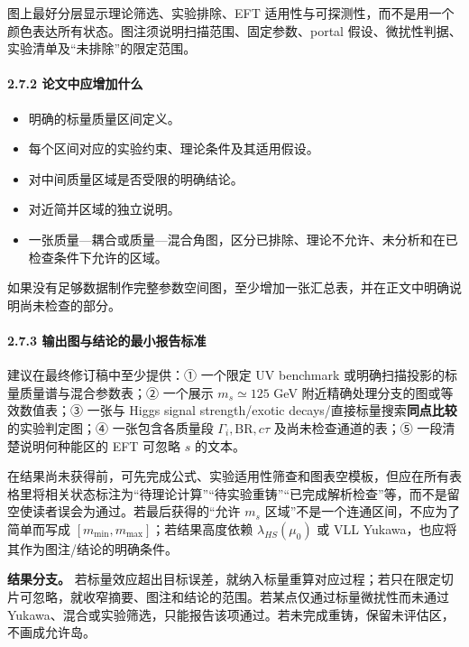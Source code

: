 \documentclass[
]{article}
\providecommand{\tightlist}{%
  \setlength{\itemsep}{0pt}\setlength{\parskip}{0pt}}
\begin{document}
图上最好分层显示理论筛选、实验排除、EFT
适用性与可探测性，而不是用一个颜色表达所有状态。图注须说明扫描范围、固定参数、portal
假设、微扰性判据、实验清单及``未排除''的限定范围。

\paragraph{2.7.2
论文中应增加什么}\label{ux8bbaux6587ux4e2dux5e94ux589eux52a0ux4ec0ux4e48}

\begin{itemize}
\tightlist
\item
  明确的标量质量区间定义。
\item
  每个区间对应的实验约束、理论条件及其适用假设。
\item
  对中间质量区域是否受限的明确结论。
\item
  对近简并区域的独立说明。
\item
  一张质量---耦合或质量---混合角图，区分已排除、理论不允许、未分析和在已检查条件下允许的区域。
\end{itemize}

如果没有足够数据制作完整参数空间图，至少增加一张汇总表，并在正文中明确说明尚未检查的部分。

\paragraph{2.7.3
输出图与结论的最小报告标准}\label{ux8f93ux51faux56feux4e0eux7ed3ux8bbaux7684ux6700ux5c0fux62a5ux544aux6807ux51c6}

建议在最终修订稿中至少提供：① 一个限定 UV benchmark
或明确扫描投影的标量质量谱与混合参数表；② 一个展示 \(m_s\simeq125\) GeV
附近精确处理分支的图或等效数值表；③ 一张与 Higgs signal strength/exotic
decays/直接标量搜索\textbf{同点比较}的实验判定图；④ 一张包含各质量段
\(\Gamma_i,\mathrm{BR},c\tau\) 及尚未检查通道的表；⑤
一段清楚说明何种能区的 EFT 可忽略 \(s\) 的文本。

在结果尚未获得前，可先完成公式、实验适用性筛查和图表空模板，但应在所有表格里将相关状态标注为``待理论计算''``待实验重铸''``已完成解析检查''等，而不是留空使读者误会为通过。若最后获得的``允许
\(m_s\) 区域''不是一个连通区间，不应为了简单而写成
\([m_{\min},m_{\max}]\)；若结果高度依赖 \(\lambda_{HS}(\mu_0)\) 或 VLL
Yukawa，也应将其作为图注/结论的明确条件。

\textbf{结果分支。}
若标量效应超出目标误差，就纳入标量重算对应过程；若只在限定切片可忽略，就收窄摘要、图注和结论的范围。若某点仅通过标量微扰性而未通过
Yukawa、混合或实验筛选，只能报告该项通过。若未完成重铸，保留未评估区，不画成允许岛。
\end{document}
